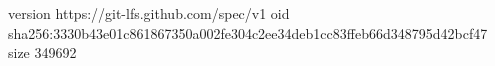 version https://git-lfs.github.com/spec/v1
oid sha256:3330b43e01c861867350a002fe304c2ee34deb1cc83ffeb66d348795d42bcf47
size 349692

